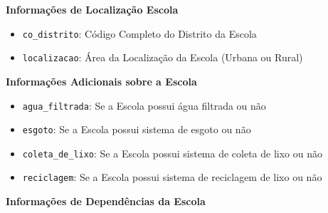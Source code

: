 \documentclass[12pt,a4paper]{article}
\begin{document}
\begin{flushleft}
    \textbf{Informações de Localização Escola}
\end{flushleft}

\begin{itemize}

    \item \texttt{co\_distrito}: Código Completo do Distrito da Escola

    \item \texttt{localizacao}: Área da Localização da Escola (Urbana ou Rural)

\end{itemize}


    
\begin{flushleft}
    \textbf{Informações Adicionais sobre a Escola}
\end{flushleft}

\begin{itemize}

    \item \texttt{agua\_filtrada}: Se a Escola possui água filtrada ou não

    \item \texttt{esgoto}: Se a Escola possui sistema de esgoto ou não

    \item \texttt{coleta\_de\_lixo}: Se a Escola possui sistema de coleta de lixo ou não

    \item \texttt{reciclagem}: Se a Escola possui sistema de reciclagem de lixo ou não

\end{itemize}

\begin{flushleft}
    \textbf{Informações de Dependências da Escola}
\end{flushleft}
\end{document}
